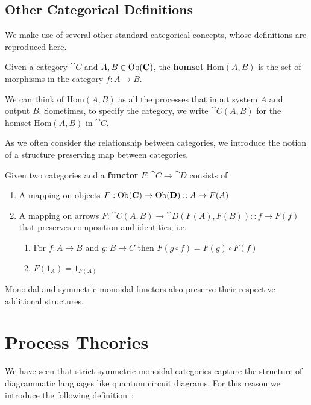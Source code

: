 \subsection{Other Categorical Definitions}

We make use of several other standard categorical concepts, whose definitions are reproduced here.

\begin{defn}
Given a category $\cat{C}$ and $A,B\in\mbox{Ob}(\mathbf{C})$, the \textbf{homset} Hom$(A,B)$ is the set of morphisms in the category $f:A\to B$.
\end{defn}

We can think of Hom$(A,B)$ as all the processes that input system $A$ and output $B$. Sometimes, to specify the category, we write $\cat{C}(A,B)$ for the homset Hom$(A,B)$ in $\cat{C}$.

As we often consider the relationship between categories, we introduce the notion of a structure preserving map between categories.

\begin{defn}
Given two categories  and  a \textbf{functor} $F:\cat{C}\to\cat{D}$ consists of
\begin{enumerate}
\item A mapping on objects $F:\mbox{Ob}(\mathbf{C})\to\mbox{Ob}(\mathbf{D})::A\mapsto F(A)$
\item A mapping on arrows $F:\cat{C}(A,B)\to\cat{D}(F(A),F(B))::f\mapsto F(f)$ that preserves composition and identities, i.e. 
\begin{enumerate}
\item For $f:A\to B$ and $g:B\to C$ then $F(g\circ f) = F(g)\circ F(f)$
\item $F(1_A)=1_{F(A)}$
\end{enumerate}
\end{enumerate}
\end{defn}

\noindent Monoidal and symmetric monoidal functors also preserve their respective additional structures.

\section{Process Theories}
\label{sec:PTs}

We have seen that strict symmetric monoidal categories capture the structure of  diagrammatic languages like quantum circuit diagrams. For this reason we introduce the following definition~\cite{coecke2015generalised}:


